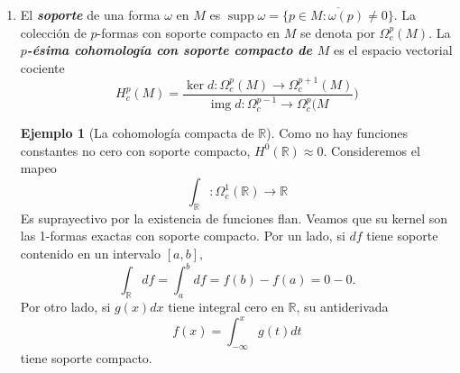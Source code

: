 \documentclass[spanish]{article}
\theoremstyle{definition}
\newtheorem*{ejem}{Ejemplo}
\newcommand{\R}{\mathbb{R}}
\DeclareMathOperator{\img}{img}
\DeclareMathOperator{\supp}{supp}
\begin{document}
\begin{enumerate}
		\item El \textbf{\textit{soporte}} de una forma $\omega$ en $M$ es $\supp \omega=\overline{\{p\in M:\omega(p)\neq0\}}$. La colección de $p$-formas con soporte compacto en $M$ se denota por $\Omega_c^p(M)$. La \textbf{\textit{$p$-ésima cohomología con soporte compacto de $M$}} es el espacio vectorial cociente
		\[H^p_c(M)=\frac{\ker d:\Omega_c^p(M)\to \Omega_c^{p+1}(M)}{\img d:\Omega_c^{p-1}\to\Omega_c^p(M})\]
			\begin{ejem}[La cohomología compacta de $\R$]
			Como no hay funciones constantes no cero con soporte compacto, $H^0(\R)\approx 0$. Consideremos el mapeo
			\[\int_\R:\Omega_c^1(\R)\to\R\]
			Es suprayectivo por la existencia de funciones flan. Veamos que su kernel son las 1-formas exactas con soporte compacto. Por un lado, si $df$ tiene soporte contenido en un intervalo $[a,b]$,
			\[\int_\R df=\int_a^bdf=f(b)-f(a)=0-0.\]
			Por otro lado, si $g(x)dx$ tiene integral cero en $\R$, su antiderivada
			\[f(x)=\int_{-\infty}^xg(t)dt\]
			tiene soporte compacto.			
		\end{ejem}
	\end{enumerate}

	\iffalse
	\begin{ejem}
		En general,
		\[H^p_c(\R^n)\approx\begin{cases}
			\begin{aligned}
				0\qquad&\text{si }p< n\\
				\R\qquad&\text{si }p=n
			\end{aligned}
		\end{cases}\]
	\end{ejem}
	\fi
	
\end{document}
